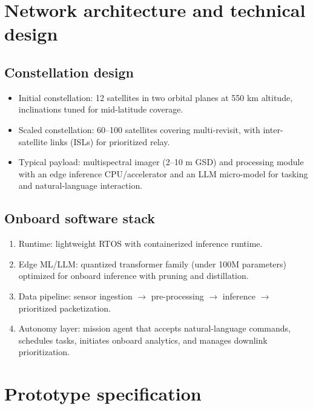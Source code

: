 \section{Network architecture and technical design}
\subsection{Constellation design}
\begin{itemize}
  \item Initial constellation: 12 satellites in two orbital planes at \num{550} km altitude, inclinations tuned for mid-latitude coverage.
  \item Scaled constellation: 60--100 satellites covering multi-revisit, with inter-satellite links (ISLs) for prioritized relay.
  \item Typical payload: multispectral imager (2--10 m GSD) and processing module with an edge inference CPU/accelerator and an LLM micro-model for tasking and natural-language interaction.
\end{itemize}

\subsection{Onboard software stack}
\begin{enumerate}
  \item Runtime: lightweight RTOS with containerized inference runtime.
  \item Edge ML/LLM: quantized transformer family (under 100M parameters) optimized for onboard inference with pruning and distillation.
  \item Data pipeline: sensor ingestion $\rightarrow$ pre-processing $\rightarrow$ inference $\rightarrow$ prioritized packetization.
  \item Autonomy layer: mission agent that accepts natural-language commands, schedules tasks, initiates onboard analytics, and manages downlink prioritization.
\end{enumerate}

\section{Prototype specification}

